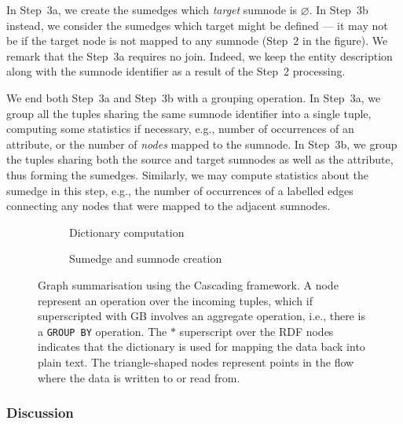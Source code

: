 In Step~3a, we create the sumedges which \emph{target} sumnode is $\varnothing$. In Step~3b instead, we consider the sumedges which target might be defined --- it may not be if the target node is not mapped to any sumnode (Step~2 in the figure). We remark that the Step~3a requires no join. Indeed, we keep the entity description along with the sumnode identifier as a result of the Step~2 processing.


We end both Step~3a and Step~3b with a grouping operation. In Step~3a, we group all the tuples sharing the same sumnode identifier into a single tuple, computing some statistics if necessary, e.g., number of occurrences of an attribute, or the number of \emph{nodes} mapped to the sumnode. In Step~3b, we group the tuples sharing both the source and target sumnodes as well as the attribute, thus forming the sumedges. Similarly, we may compute statistics about the sumedge in this step, e.g., the number of occurrences of a labelled edges connecting any nodes that were mapped to the adjacent sumnodes.

\begin{figure}
	\centering
	\begin{subfigure}{\textwidth}
		\centering
		\resizebox{.6\textwidth}{!}{
			
		}
		\caption{Dictionary computation}
		\label{fig:dict-cascading}
	\end{subfigure}
	\qquad
	\begin{subfigure}{\textwidth}
		\centering
		\resizebox{\textwidth}{!}{
			
		}
		\caption{Sumedge and sumnode creation}
		\label{fig:va-cascading}
	\end{subfigure}
	\caption[Graph summarisation using the Cascading framework]{Graph summarisation using the Cascading framework. A node represent an operation over the incoming tuples, which if superscripted with GB involves an aggregate operation, i.e., there is a \texttt{GROUP BY} operation. The $*$ superscript over the RDF nodes indicates that the dictionary is used for mapping the data back into plain text. The triangle-shaped nodes represent points in the flow where the data is written to or read from.}
	\label{fig:summary-cascading}
\end{figure}

\subsubsection{Discussion}

